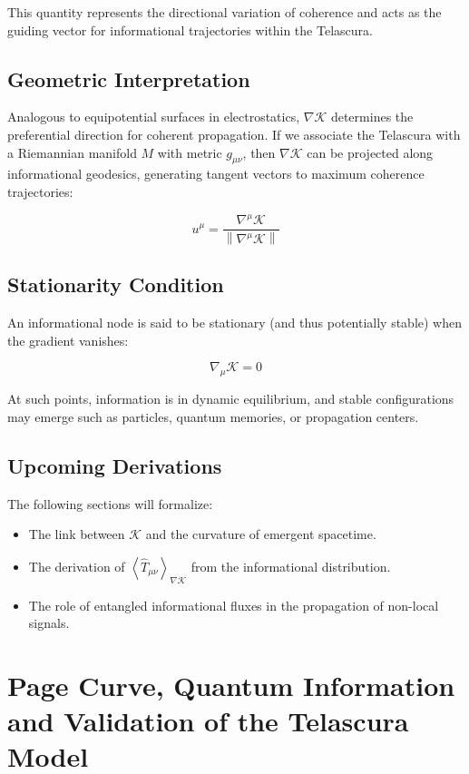 \documentclass[12pt]{article}
\begin{document}
This quantity represents the directional variation of coherence and acts as the guiding vector for informational trajectories within the Telascura.

\subsection*{Geometric Interpretation}
Analogous to equipotential surfaces in electrostatics, $\nabla \mathcal{K}$ determines the preferential direction for coherent propagation. If we associate the Telascura with a Riemannian manifold $M$ with metric $g_{\mu\nu}$, then $\nabla \mathcal{K}$ can be projected along informational geodesics, generating tangent vectors to maximum coherence trajectories:

\begin{equation}
u^\mu = \frac{\nabla^\mu \mathcal{K}}{\left\| \nabla^\mu \mathcal{K} \right\|}
\end{equation}

\subsection*{Stationarity Condition}
An informational node is said to be stationary (and thus potentially stable) when the gradient vanishes:

\begin{equation}
\nabla_\mu \mathcal{K} = 0
\end{equation}

At such points, information is in dynamic equilibrium, and stable configurations may emerge such as particles, quantum memories, or propagation centers.

\subsection*{Upcoming Derivations}
The following sections will formalize:
\begin{itemize}
    \item The link between $\mathcal{K}$ and the curvature of emergent spacetime.
    \item The derivation of $\left\langle \hat{T}_{\mu\nu} \right\rangle_{\nabla \mathcal{K}}$ from the informational distribution.
    \item The role of entangled informational fluxes in the propagation of non-local signals.
\end{itemize}

\section{Page Curve, Quantum Information and Validation of the Telascura Model}
\end{document}
